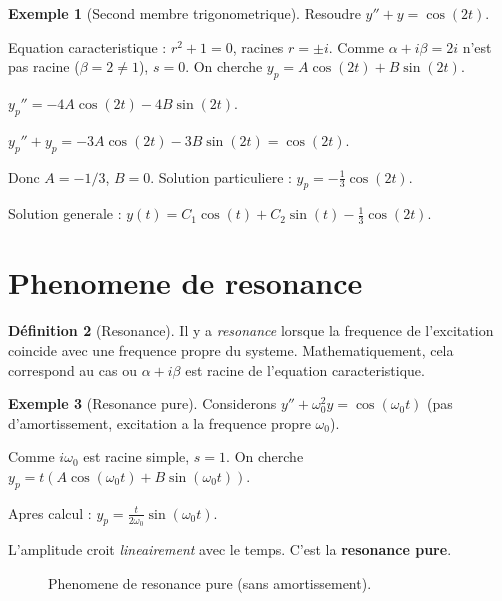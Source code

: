 \documentclass[12pt,a4paper,openany]{book}
\theoremstyle{definition}
\newtheorem{definition}{Définition}[chapter]
\newtheorem{exemple}[definition]{Exemple}
\theoremstyle{plain}
\theoremstyle{remark}
\begin{document}
\begin{exemple}[Second membre trigonometrique]\label{ex:sp-trigo}
Resoudre $y'' + y = \cos(2t)$.

Equation caracteristique : $r^2 + 1 = 0$, racines $r = \pm i$. Comme $\alpha + i\beta = 2i$ n'est pas racine ($\beta = 2 \neq 1$), $s = 0$. On cherche $y_p = A\cos(2t) + B\sin(2t)$.

$y_p'' = -4A\cos(2t) - 4B\sin(2t)$.

$y_p'' + y_p = -3A\cos(2t) - 3B\sin(2t) = \cos(2t)$.

Donc $A = -1/3$, $B = 0$. Solution particuliere : $y_p = -\frac{1}{3}\cos(2t)$.

Solution generale : $y(t) = C_1\cos(t) + C_2\sin(t) - \frac{1}{3}\cos(2t)$.
\end{exemple}

\section{Phenomene de resonance}\label{sec:resonance}

\begin{definition}[Resonance]\label{def:resonance}
Il y a \emph{resonance} lorsque la frequence de l'excitation coincide avec une frequence propre du systeme. Mathematiquement, cela correspond au cas ou $\alpha + i\beta$ est racine de l'equation caracteristique.
\end{definition}

\begin{exemple}[Resonance pure]\label{ex:resonance-pure}
Considerons $y'' + \omega_0^2 y = \cos(\omega_0 t)$ (pas d'amortissement, excitation a la frequence propre $\omega_0$).

Comme $i\omega_0$ est racine simple, $s = 1$. On cherche $y_p = t(A\cos(\omega_0 t) + B\sin(\omega_0 t))$.

Apres calcul : $y_p = \frac{t}{2\omega_0}\sin(\omega_0 t)$.

L'amplitude croit \emph{lineairement} avec le temps. C'est la \textbf{resonance pure}.
\end{exemple}

\begin{figure}[ht]
\centering
{}
\caption{Phenomene de resonance pure (sans amortissement).}\label{fig:resonance}
\end{figure}
\end{document}
